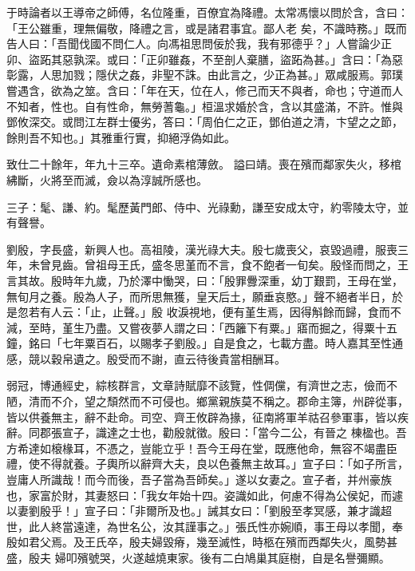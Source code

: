 \begin{pinyinscope}
 于時論者以王導帝之師傅，名位隆重，百僚宜為降禮。太常馮懷以問於含，含曰：「王公雖重，理無偏敬，降禮之言，或是諸君事宜。鄙人老
 矣，不識時務。」既而告人曰：「吾聞伐國不問仁人。向馮祖思問佞於我，我有邪德乎？」人嘗論少正卯、盜跖其惡孰深。或曰：「正卯雖姦，不至剖人棄膳，盜跖為甚。」含曰：「為惡彰露，人思加戮；隱伏之姦，非聖不誅。由此言之，少正為甚。」眾咸服焉。郭璞嘗遇含，欲為之筮。含曰：「年在天，位在人，修己而天不與者，命也；守道而人不知者，性也。自有性命，無勞蓍龜。」桓溫求婚於含，含以其盛滿，不許。惟與鄧攸深交。或問江左群士優劣，答曰：「周伯仁之正，鄧伯道之清，卞望之之節，餘則吾不知也。」其雅重行實，抑絕浮偽如此。



 致仕二十餘年，年九十三卒。遺命素棺薄斂。
 謚曰靖。喪在殯而鄰家失火，移棺紼斷，火將至而滅，僉以為淳誠所感也。



 三子：髦、謙、約。髦歷黃門郎、侍中、光祿勳，謙至安成太守，約零陵太守，並有聲譽。



 劉殷，字長盛，新興人也。高祖陵，漢光祿大夫。殷七歲喪父，哀毀過禮，服喪三年，未曾見齒。曾祖母王氏，盛冬思堇而不言，食不飽者一旬矣。殷怪而問之，王言其故。殷時年九歲，乃於澤中慟哭，曰：「殷罪釁深重，幼丁艱罰，王母在堂，無旬月之養。殷為人子，而所思無獲，皇天后土，願垂哀愍。」聲不絕者半日，於是忽若有人云：「止，止聲。」殷
 收淚視地，便有堇生焉，因得斛餘而歸，食而不減，至時，堇生乃盡。又嘗夜夢人謂之曰：「西籬下有粟。」寤而掘之，得粟十五鐘，銘曰「七年粟百石，以賜孝子劉殷。」自是食之，七載方盡。時人嘉其至性通感，競以穀帛遺之。殷受而不謝，直云待後貴當相酬耳。



 弱冠，博通經史，綜核群言，文章詩賦靡不該覽，性倜儻，有濟世之志，儉而不陋，清而不介，望之頹然而不可侵也。鄉黨親族莫不稱之。郡命主簿，州辟從事，皆以供養無主，辭不赴命。司空、齊王攸辟為掾，征南將軍羊祜召參軍事，皆以疾辭。同郡張宣子，識達之士也，勸殷就徵。殷曰：「當今二公，有晉之
 棟楹也。吾方希達如榱椽耳，不憑之，豈能立乎！吾今王母在堂，既應他命，無容不竭盡臣禮，使不得就養。子輿所以辭齊大夫，良以色養無主故耳。」宣子曰：「如子所言，豈庸人所識哉！而今而後，吾子當為吾師矣。」遂以女妻之。宣子者，并州豪族也，家富於財，其妻怒曰：「我女年始十四。姿識如此，何慮不得為公侯妃，而遽以妻劉殷乎！」宣子曰：「非爾所及也。」誡其女曰：「劉殷至孝冥感，兼才識超世，此人終當遠達，為世名公，汝其謹事之。」張氏性亦婉順，事王母以孝聞，奉殷如君父焉。及王氏卒，殷夫婦毀瘠，幾至滅性，時柩在殯而西鄰失火，風勢甚盛，殷夫
 婦叩殯號哭，火遂越燒東家。後有二白鳩巢其庭樹，自是名譽彌顯。




\end{pinyinscope}

